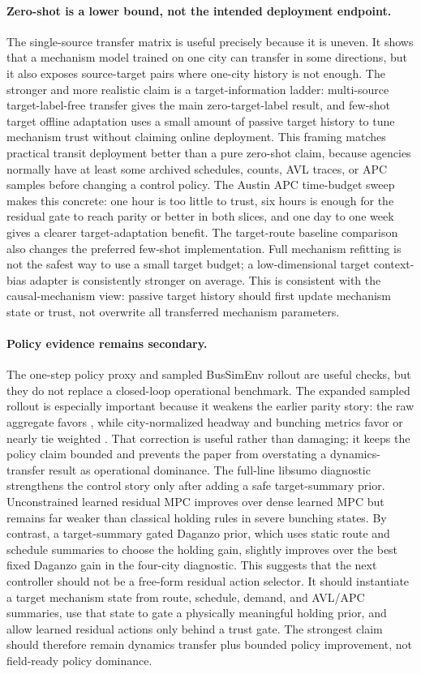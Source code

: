 \paragraph{Zero-shot is a lower bound, not the intended deployment endpoint.}
The single-source transfer matrix is useful precisely because it is uneven.
It shows that a mechanism model trained on one city can transfer in some directions, but it also exposes source-target pairs where one-city history is not enough.
The stronger and more realistic claim is a target-information ladder: multi-source target-label-free transfer gives the main zero-target-label result, and few-shot target offline adaptation uses a small amount of passive target history to tune mechanism trust without claiming online deployment.
This framing matches practical transit deployment better than a pure zero-shot claim, because agencies normally have at least some archived schedules, counts, AVL traces, or APC samples before changing a control policy.
The Austin APC time-budget sweep makes this concrete: one hour is too little to trust, six hours is enough for the residual gate to reach parity or better in both slices, and one day to one week gives a clearer target-adaptation benefit.
The target-route baseline comparison also changes the preferred few-shot implementation.
Full mechanism refitting is not the safest way to use a small target budget; a low-dimensional target context-bias adapter is consistently stronger on average.
This is consistent with the causal-mechanism view: passive target history should first update mechanism state or trust, not overwrite all transferred mechanism parameters.

\paragraph{Policy evidence remains secondary.}
The one-step policy proxy and sampled BusSimEnv rollout are useful checks, but they do not replace a closed-loop operational benchmark.
The expanded sampled rollout is especially important because it weakens the earlier parity story: the raw aggregate favors \Htwo, while city-normalized headway and bunching metrics favor or nearly tie weighted \ours.
That correction is useful rather than damaging; it keeps the policy claim bounded and prevents the paper from overstating a dynamics-transfer result as operational dominance.
The full-line libsumo diagnostic strengthens the control story only after adding a safe target-summary prior.
Unconstrained learned residual MPC improves over dense learned MPC but remains far weaker than classical holding rules in severe bunching states.
By contrast, a target-summary gated Daganzo prior, which uses static route and schedule summaries to choose the holding gain, slightly improves over the best fixed Daganzo gain in the four-city diagnostic.
This suggests that the next controller should not be a free-form residual action selector.
It should instantiate a target mechanism state from route, schedule, demand, and AVL/APC summaries, use that state to gate a physically meaningful holding prior, and allow learned residual actions only behind a trust gate.
The strongest claim should therefore remain dynamics transfer plus bounded policy improvement, not field-ready policy dominance.

